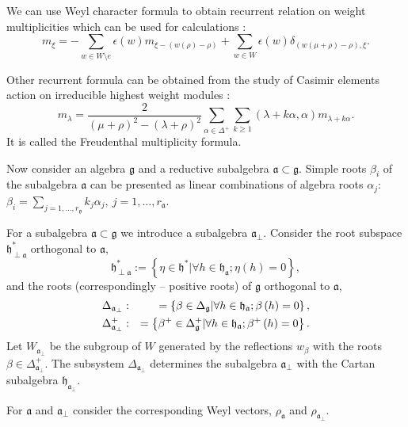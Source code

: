 \documentclass[preprint,12pt]{elsarticle}
\newcommand{\gf}{\mathfrak{g}}
\newcommand{\af}{\mathfrak{a}}
\newcommand{\afb}{\mathfrak{a}_{\bot}}
\newcommand{\hf}{\mathfrak{h}}
\begin{document}

We can use Weyl character formula to obtain recurrent relation on weight multiplicities which can be used for calculations \cite{il2010folded,kulish4sfa}:
\begin{equation}
\label{eq:14}
m_{\xi }=-\sum_{w\in W\setminus e}\epsilon (w)m_{\xi
-\left( w(\rho )-\rho \right) }+\sum_{w\in W}\epsilon
(w)\delta _{\left( w(\mu +\rho )-\rho \right) ,\xi }.  
\end{equation}

Other recurrent formula can be obtained from the study of Casimir
elements action on irreducible highest weight modules
\cite{humphreys1997introduction}:
\begin{equation}
  \label{eq:15}
  m_{\lambda}=\frac{2}{(\mu+\rho)^{2}-(\lambda+\rho)^{2}}\sum_{\alpha\in \Delta^{+}}\sum_{k\geq 1} (\lambda+k\alpha,\alpha)m_{\lambda+k\alpha}.
\end{equation}
It is called the Freudenthal multiplicity formula.

Now consider an algebra $\gf$ and a reductive subalgebra
$\af\subset \gf$. Simple roots $\beta_{i}$ of the subalgebra $\af$
can be presented as linear combinations of algebra roots
$\alpha_{j}$: $\beta_{i}=\sum_{j=1,\dots,r_{\gf}}k_{j}
\alpha_{j},\ j=1,\dots,r_{\af}$.

For a subalgebra $\af\subset \gf$ we introduce a subalgebra
$\afb$. Consider the root subspace $\hf_{\perp \af}^{\ast }$
orthogonal to $\af$,
\begin{equation*}
\hf_{\perp \af}^{\ast }:=\left\{ \eta \in \hf^{\ast }|\forall
h\in \hf_{\af};\eta \left( h\right) =0\right\} ,
\end{equation*}
and the roots (correspondingly -- positive roots) of $\gf$ orthogonal
to $\af$,
\begin{eqnarray}
\Delta _{\afb} &:&=\left\{ \beta \in \Delta _{\gf}|\forall
h\in \hf_{\af};\beta \left( h\right) =0\right\} ,
\label{delta a ort} \\
\Delta _{\afb}^{+} &:&=\left\{ \beta ^{+}\in \Delta _{\gf%
}^{+}|\forall h\in \hf_{\af};\beta ^{+}\left( h\right) =0\right\} .
\notag
\end{eqnarray}
Let $W_{\afb}$ be the subgroup of $W$ generated by the
reflections $w_{\beta }$ with the roots $\beta \in \Delta _{\af_{\perp
}}^{+}$. The subsystem $\Delta _{\afb}$ determines the
subalgebra $\afb$ with the Cartan subalgebra $\hf_{\af%
_{\perp }}$. 

For $\af$ and $\afb$ consider the
corresponding Weyl vectors, $\rho _{\af}$ and $\rho _{\af_{\perp
}} $.
\end{document}
